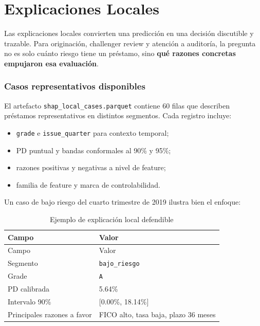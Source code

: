 \documentclass[
  spanish,
  11pt,
  letterpaper,
]{scrbook}
\providecommand{\tightlist}{%
  \setlength{\itemsep}{0pt}\setlength{\parskip}{0pt}}
\theoremstyle{plain}
\theoremstyle{remark}
\begin{document}
\chapter{Explicaciones Locales}\label{sec-local-explanations}

Las explicaciones locales convierten una predicción en una decisión
discutible y trazable. Para originación, challenger review y atención a
auditoría, la pregunta no es solo cuánto riesgo tiene un préstamo, sino
\textbf{qué razones concretas empujaron esa evaluación}.

\subsection{Casos representativos
disponibles}\label{casos-representativos-disponibles}

El artefacto \texttt{shap\_local\_cases.parquet} contiene 60 filas que
describen préstamos representativos en distintos segmentos. Cada
registro incluye:

\begin{itemize}
\tightlist
\item
  \texttt{grade} e \texttt{issue\_quarter} para contexto temporal;
\item
  PD puntual y bandas conformales al 90\% y 95\%;
\item
  razones positivas y negativas a nivel de feature;
\item
  familia de feature y marca de controlabilidad.
\end{itemize}

Un caso de bajo riesgo del cuarto trimestre de 2019 ilustra bien el
enfoque:

\begin{longtable}[]{@{}ll@{}}
\caption{Ejemplo de explicación local
defendible}\label{tbl-local-example}\tabularnewline
\toprule\noalign{}
Campo & Valor \\
\midrule\noalign{}
\endfirsthead
\toprule\noalign{}
Campo & Valor \\
\midrule\noalign{}
\endhead
\bottomrule\noalign{}
\endlastfoot
Segmento & \texttt{bajo\_riesgo} \\
Grade & \texttt{A} \\
PD calibrada & 5.64\% \\
Intervalo 90\% & {[}0.00\%, 18.14\%{]} \\
Principales razones a favor & FICO alto, tasa baja, plazo 36 meses \\
\end{longtable}
\end{document}
